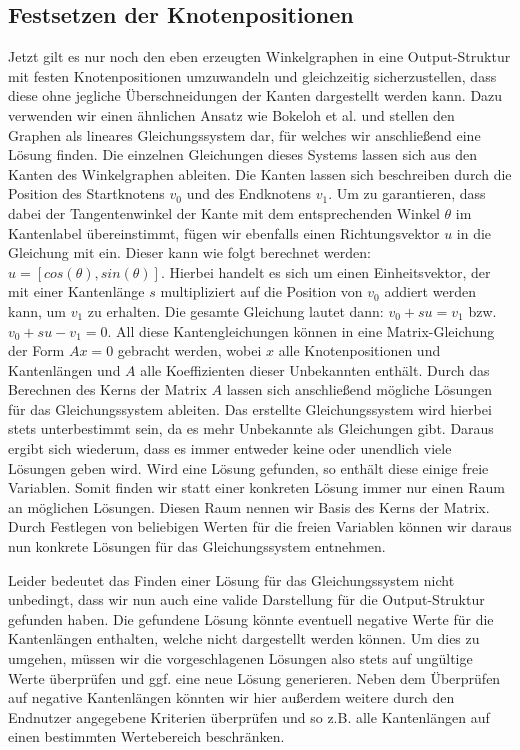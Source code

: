 \subsection{Festsetzen der Knotenpositionen}
Jetzt gilt es nur noch den eben erzeugten Winkelgraphen in eine Output-Struktur mit festen Knotenpositionen umzuwandeln und gleichzeitig sicherzustellen,
dass diese ohne jegliche Überschneidungen der Kanten dargestellt werden kann. Dazu verwenden wir einen ähnlichen Ansatz wie Bokeloh et al. \cite{4_bokeloh_et_al}
und stellen den Graphen als lineares Gleichungssystem dar, für welches wir anschließend eine Lösung finden. Die einzelnen Gleichungen dieses Systems lassen
sich aus den Kanten des Winkelgraphen ableiten. Die Kanten lassen sich beschreiben durch die Position des Startknotens \(v_0\) und des Endknotens \(v_1\).
Um zu garantieren, dass dabei der Tangentenwinkel der Kante mit dem entsprechenden Winkel \(\theta\) im Kantenlabel übereinstimmt, fügen wir ebenfalls einen
Richtungsvektor \(u\) in die Gleichung mit ein. Dieser kann wie folgt berechnet werden: \(u = [cos(\theta), sin(\theta)]\). Hierbei handelt es sich um einen
Einheitsvektor, der mit einer Kantenlänge \(s\) multipliziert auf die Position von \(v_0\) addiert werden kann, um \(v_1\) zu erhalten. Die gesamte Gleichung
lautet dann: \(v_0 + su = v_1\) bzw. \(v_0 + su - v_1 = 0\). All diese Kantengleichungen können in eine Matrix-Gleichung der Form \(Ax = 0\) gebracht werden,
wobei \(x\) alle Knotenpositionen und Kantenlängen und \(A\) alle Koeffizienten dieser Unbekannten enthält. Durch das Berechnen des Kerns der Matrix \(A\)
lassen sich anschließend mögliche Lösungen für das Gleichungssystem ableiten. Das erstellte Gleichungssystem wird hierbei stets unterbestimmt sein, da es
mehr Unbekannte als Gleichungen gibt. Daraus ergibt sich wiederum, dass es immer entweder keine oder unendlich viele Lösungen geben wird. Wird eine Lösung
gefunden, so enthält diese einige freie Variablen. Somit finden wir statt einer konkreten Lösung immer nur einen Raum an möglichen Lösungen. Diesen Raum
nennen wir Basis des Kerns der Matrix. Durch Festlegen von beliebigen Werten für die freien Variablen können wir daraus nun konkrete Lösungen für das Gleichungssystem
entnehmen.

Leider bedeutet das Finden einer Lösung für das Gleichungssystem nicht unbedingt, dass wir nun auch eine valide Darstellung für die Output-Struktur
gefunden haben. Die gefundene Lösung könnte eventuell negative Werte für die Kantenlängen enthalten, welche nicht dargestellt werden können. Um dies zu umgehen,
müssen wir die vorgeschlagenen Lösungen also stets auf ungültige Werte überprüfen und ggf. eine neue Lösung generieren. Neben dem Überprüfen auf negative
Kantenlängen könnten wir hier außerdem weitere durch den Endnutzer angegebene Kriterien überprüfen und so z.B. alle Kantenlängen auf einen bestimmten Wertebereich
beschränken.